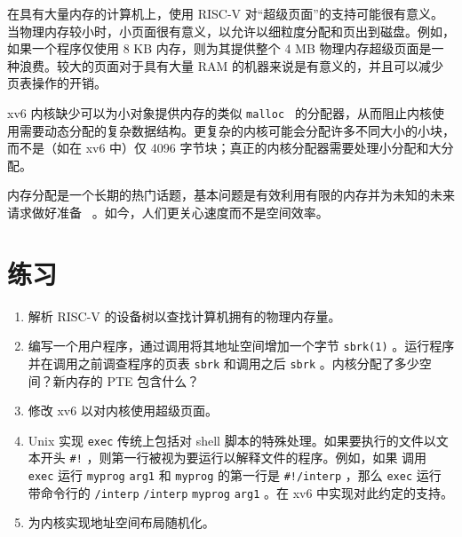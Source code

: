 在具有大量内存的计算机上，使用 RISC-V 对“超级页面”的支持可能很有意义。当物理内存较小时，小页面很有意义，以允许以细粒度分配和页出到磁盘。例如，如果一个程序仅使用 8 KB 内存，则为其提供整个 4 MB 物理内存超级页面是一种浪费。较大的页面对于具有大量 RAM 的机器来说是有意义的，并且可以减少页表操作的开销。  

xv6 内核缺少可以为小对象提供内存的类似  {    \tt    malloc   }  的分配器，从而阻止内核使用需要动态分配的复杂数据结构。更复杂的内核可能会分配许多不同大小的小块，而不是（如在 xv6 中）仅 4096 字节块；真正的内核分配器需要处理小分配和大分配。  

内存分配是一个长期的热门话题，基本问题是有效利用有限的内存并为未知的未来请求做好准备~    \cite{knuth}    。如今，人们更关心速度而不是空间效率。
    \section{练习  }     

   \begin{enumerate}

 
   \item   解析 RISC-V 的设备树以查找计算机拥有的物理内存量。   \item   编写一个用户程序，通过调用将其地址空间增加一个字节
    \lstinline{sbrk(1)}    。运行程序并在调用之前调查程序的页表
    \lstinline{sbrk}    和调用之后
    \lstinline{sbrk}    。内核分配了多少空间？新内存的 PTE 包含什么？   \item   修改 xv6 以对内核使用超级页面。   \item   Unix 实现
    \lstinline{exec}    传统上包括对 shell 脚本的特殊处理。如果要执行的文件以文本开头
    \lstinline{#!}    ，则第一行被视为要运行以解释文件的程序。例如，如果
 调用   \lstinline{exec}   运行
    \lstinline{myprog}   
    \lstinline{arg1}    和
    \lstinline{myprog}    的第一行是
    \lstinline{#!/interp}   ，那么
    \lstinline{exec}    运行
 带命令行的    \lstinline{/interp}   
    \lstinline{/interp}   
    \lstinline{myprog}   
    \lstinline{arg1}    。在 xv6 中实现对此约定的支持。   \item   为内核实现地址空间布局随机化。  \end{enumerate}     


